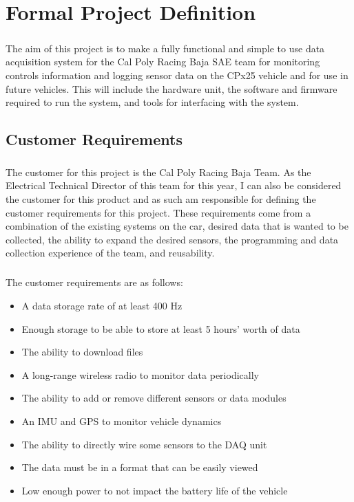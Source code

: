 \chapter{Formal Project Definition}

\paragraph{}
The aim of this project is to make a fully functional and simple to use data acquisition system for the Cal Poly Racing Baja SAE team for monitoring controls information and logging sensor data on the CPx25 vehicle and for use in future vehicles.
This will include the hardware unit, the software and firmware required to run the system, and tools for interfacing with the system.

\section{Customer Requirements}

\paragraph{}
The customer for this project is the Cal Poly Racing Baja Team.
As the Electrical Technical Director of this team for this year, I can also be considered the customer for this product and as such am responsible for defining the customer requirements for this project.
These requirements come from a combination of the existing systems on the car, desired data that is wanted to be collected, the ability to expand the desired sensors, the programming and data collection experience of the team, and reusability.

\paragraph{}
The customer requirements are as follows:
\begin{itemize}
	\item A data storage rate of at least 400 Hz
	\item Enough storage to be able to store at least 5 hours' worth of data
	\item The ability to download files
	\item A long-range wireless radio to monitor data periodically
	\item The ability to add or remove different sensors or data modules
	\item An IMU and GPS to monitor vehicle dynamics
	\item The ability to directly wire some sensors to the DAQ unit
	\item The data must be in a format that can be easily viewed
	\item Low enough power to not impact the battery life of the vehicle
\end{itemize}

